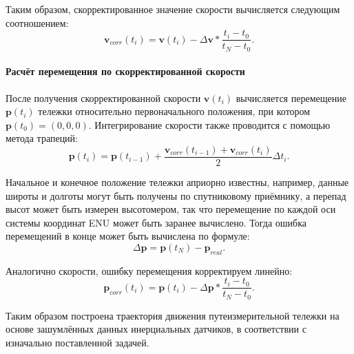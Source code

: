 Таким образом, скорректированное значение скорости вычисляется следующим соотношением:
\begin{equation}
	\bm{v}_{corr}(t_i) = \bm{v}(t_i) - \Delta \bm{v} * \frac{t_i - t_0}{t_N - t_0} \text{.}
\end{equation}


\paragraph{Расчёт перемещения по скорректированной скорости}
После получения скорректированной скорости $\bm{v}(t_i)$ вычисляется перемещение $\bm{p}(t_i)$ тележки относительно первоначального положения, при котором $\bm{p}(t_0) = (0, 0, 0)$. Интегрирование скорости также проводится с помощью метода трапеций:
\begin{equation}
	\bm{p}(t_i) = \bm{p}(t_{i-1}) + \frac{\bm{v}_{corr}(t_{i-1}) + \bm{v}_{corr}(t_i)}{2} \Delta t_i \text{.}
\end{equation}

Начальное и конечное положение тележки априорно известны, например, данные широты и долготы могут быть получены по спутниковому приёмнику, а перепад высот может быть измерен высотомером, так что перемещение по каждой оси системы координат ENU может быть заранее вычислено. Тогда ошибка перемещений в конце может быть вычислена по формуле:
\begin{equation*}
	\Delta \bm{p} = \bm{p}(t_N) - \bm{p}_{real} \text{.}
\end{equation*}

Аналогично скорости, ошибку перемещения корректируем линейно:
\begin{equation}
	\bm{p}_{corr}(t_i) = \bm{p}(t_i) - \Delta \bm{p} * \frac{t_i - t_0}{t_N - t_0} \text{.}
\end{equation}

Таким образом построена траектория движения путеизмерительной тележки на основе зашумлённых данных инерциальных датчиков, в соответствии с изначально поставленной задачей.